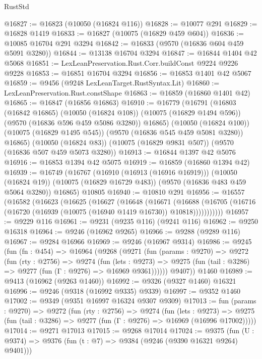 \begin{lexlean}{RustStd}
\begin{coremodule}
{\begin{coremodule}
{{{{{{{{{{{{{{{{{{{{{{{{{{{{{{{{{@16827 := @16823 (@10050 (@16824 @116))
@16828 := @10077 @291
@16829 := @16828 @1419
@16833 := @16827 (@10075 (@16829 @459 @604))
@16836 := @10085 @16704 @291 @3294
@16842 := @16833 (@9570 (@16836 @604 @459 @5091 @3280))
@16844 := @13138 @16704 @3294
@16847 := @16844 @1404 @42 @5068
@16851 := LexLeanPreservation.Rust.Corr.buildConst @9224 @9226 @9228
@16853 := @16851 @16704 @3294
@16856 := @16853 @1401 @42 @5067
@16859 := @9456 (@9248 LexLeanTarget.RustSyntax.Lit)
@16860 := LexLeanPreservation.Rust.constShape
@16863 := @16859 (@16860 @1401 @42)
@16865 := @16847 (@16856 @16863)
@16910 := @16779
    (@16791
      (@16803
        (@16842 @16865)
        (@10050 (@16824 @108))
        (@10075 (@16829 @1494 @596))
        (@9570 (@16836 @596 @459 @5086 @3280))
        @16865)
      (@10050 (@16824 @100))
      (@10075 (@16829 @1495 @545))
      (@9570 (@16836 @545 @459 @5081 @3280))
      @16865)
    (@10050 (@16824 @83))
    (@10075 (@16829 @9831 @507))
    (@9570 (@16836 @507 @459 @5073 @3280))
@16913 := @16844 @1397 @42 @5076
@16916 := @16853 @1394 @42 @5075
@16919 := @16859 (@16860 @1394 @42)
@16939 := @16749
    (@16767
      (@16910 (@16913 (@16916 @16919)))
      (@10050 (@16824 @19))
      (@10075 (@16829 @16729 @483))
      (@9570 (@16836 @483 @459 @5064 @3280))
      @16865)
    @10805
@16940 := @10810 @291
@16956 := @16557
    (@16582
      (@16623
        (@16625
          (@16627
            (@16648
              (@16671
                (@16688
                  (@16705 (@16716 (@16720 (@16939 (@10075 (@16940 @1419 @16730)) @10818)))))))))))
@16957 := @9229 @116
@16961 := @9231 (@9235 @116) (@9241 @116)
@16962 := @9250 @16318
@16964 := @9246 (@16962 @9265)
@16966 := @9288 (@9289 @116)
@16967 := @9284 @16966
@16969 := @9246 (@16967 @9314)
@16986 := @9245
    (fun (fn : @454) =>
    @16964
      (@9268
        (@9271
          (fun (params : @9270) =>
          @9272
            (fun (rty : @2756) =>
            @9274
              (fun (lets : @9273) =>
              @9275 (fun (tail : @3286) => @9277 (fun (Γ : @9276) => @16969 @9361))))))
        @9407))
    @1460
@16989 := @9413 (@16962 (@9263 @1460))
@16992 := @9326 (@9327 @1460) @16321
@16996 := @9246 (@9318 (@16992 @9335) @9339)
@16997 := @9352 @1460
@17002 := @9349 (@9351 @16997 @16324 @9307 @9309)
@17013 := fun (params : @9270) =>
  @9272
    (fun (rty : @2756) =>
    @9274
      (fun (lets : @9273) =>
      @9275 (fun (tail : @3286) => @9277 (fun (Γ : @9276) => @16969 (@16996 @17002)))))
@17014 := @9271 @17013
@17015 := @9268 @17014
@17024 := @9375
    (fun (U : @9374) => @9376 (fun (t : @7) => @9384 (@9246 (@9390 @16321 @9264) @9401)))
}}}}}}}}}}}}}}}}}}}}}}}}}}}}}}}}}
\end{coremodule}}
\end{coremodule}
\end{lexlean}
